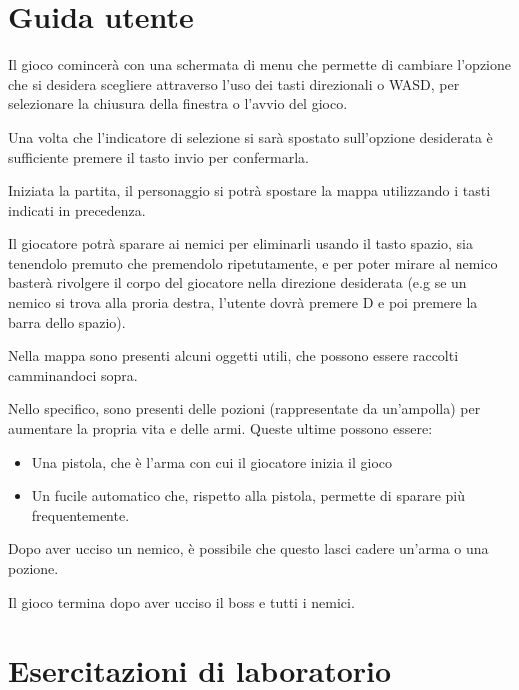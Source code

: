 \documentclass[a4paper,12pt]{report}
\begin{document}
    \chapter{Guida utente}
    \par Il gioco comincerà con una schermata di menu che permette di cambiare l'opzione che si desidera scegliere attraverso l'uso
     dei tasti direzionali o  WASD, per selezionare la chiusura della finestra o l'avvio del gioco.
    \par Una volta che l'indicatore di selezione si sarà spostato sull'opzione desiderata è sufficiente premere il tasto invio per confermarla.
    \par Iniziata la partita, il personaggio si potrà spostare la mappa utilizzando i tasti indicati in precedenza.
    \par Il giocatore potrà sparare ai nemici per eliminarli usando il tasto spazio, sia tenendolo premuto che premendolo ripetutamente,
     e per poter mirare al nemico basterà rivolgere il corpo del giocatore nella direzione desiderata (e.g se un nemico si trova alla
     proria destra, l'utente dovrà premere D e poi premere la barra dello spazio).
     \par Nella mappa sono presenti alcuni oggetti utili, che possono essere raccolti camminandoci sopra.
     \par Nello specifico, sono presenti delle pozioni (rappresentate da un'ampolla) per aumentare la propria vita e delle armi. Queste ultime possono essere:
     \begin{itemize}
         \item Una pistola, che è l'arma con cui il giocatore inizia il gioco
         \item Un fucile automatico che, rispetto alla pistola, permette di sparare più frequentemente.
     \end{itemize}
     \par Dopo aver ucciso un nemico, è possibile che questo lasci cadere un'arma o una pozione.
    \par Il gioco termina dopo aver ucciso il boss e tutti i nemici.
    \chapter{Esercitazioni di laboratorio}
    \printbibliography[heading=bibintoc]
\end{document}
